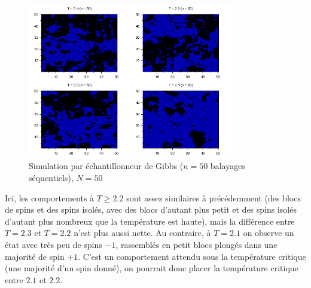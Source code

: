 \documentclass[a4paper,11pt]{article}
\begin{document}
\begin{figure}[!htbp]
	\centering
	\includegraphics[width=0.8\textwidth]{temperature_critique_gibbs_N50_n50.png}
	\caption{Simulation par échantillonneur de Gibbs ($n = 50$ balayages séquentiels), $N = 50$}
	\label{fig:tc_gibbs_N50_n50}
\end{figure}
Ici, les comportements à $T \geq 2.2$ sont assez similaires à précédemment (des blocs de spins et des spins isolés, avec des blocs d'autant plus petit et des spins isolés d'autant plus nombreux que la température est haute), mais la différence entre $T = 2.3$ et $T = 2.2$ n'est plus aussi nette. Au contraire, à $T = 2.1$ on observe un état avec très peu de spins $-1$, rassemblés en petit blocs plongés dans une majorité de spin $+1$. C'est un comportement attendu sous la température critique (une majorité d'un spin donné), on pourrait donc placer la température critique entre $2.1$ et $2.2$.
\end{document}
